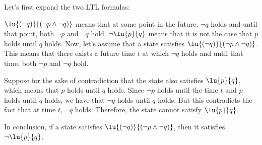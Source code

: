 \documentclass[11pt]{article}
\begin{document}
Let's first expand the two LTL formulas:

$\lu{(\neg q)}{(\neg p \land \neg q)}$ means that at some point in the future, $\neg q$ holds and until that point, both $\neg p$ and $\neg q$ hold.
$\neg \lu{p}{q}$ means that it is not the case that $p$ holds until $q$ holds.
Now, let's assume that a state satisfies $\lu{(\neg q)}{(\neg p \land \neg q)}$. This means that there exists a future time $t$ at which $\neg q$ holds and until that time, both $\neg p$ and $\neg q$ hold.

Suppose for the sake of contradiction that the state also satisfies $\lu{p}{q}$, which means that $p$ holds until $q$ holds. Since $\neg p$ holds until the time $t$ and $p$ holds until $q$ holds, we have that $\neg q$ holds until $q$ holds. But this contradicts the fact that at time $t$, $\neg q$ holds. Therefore, the state cannot satisfy $\lu{p}{q}$.

In conclusion, if a state satisfies $\lu{(\neg q)}{(\neg p \land \neg q)}$, then it satisfies $\neg \lu{p}{q}$.
\end{document}
